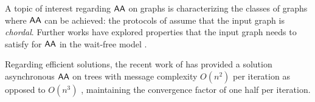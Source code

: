 A topic of interest regarding $\textsf{AA}$ on graphs is characterizing the classes of graphs where $\textsf{AA}$ can be achieved: the protocols of \cite{DISC:NoRy19,eprint:ConvexWorld} assume that the input graph is \emph{chordal}. Further works have explored properties that the input graph needs to satisfy for $\textsf{AA}$ in the wait-free model \cite{SIROCCO:Alistarh21, OPODIS:Liu23}.

Regarding efficient solutions, the recent work of \cite{MoseArxivNew} has provided a solution asynchronous $\textsf{AA}$ on trees with message complexity $O(n^2)$ per iteration as opposed to $O(n^3)$ \cite{DISC:NoRy19}, maintaining the convergence factor of one half per iteration.


